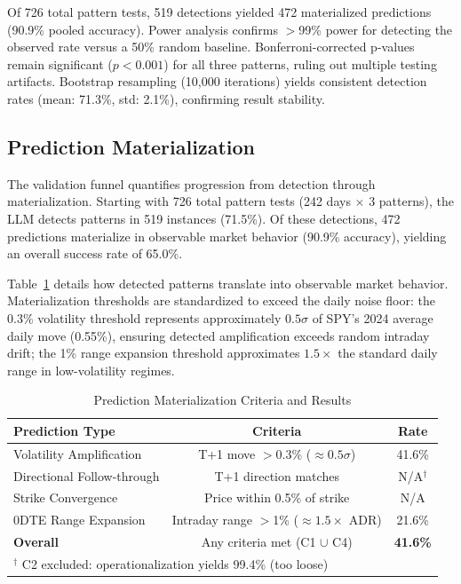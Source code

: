 Of 726 total pattern tests, 519 detections yielded 472 materialized predictions (90.9\% pooled accuracy). Power analysis confirms $>$99\% power for detecting the observed rate versus a 50\% random baseline. Bonferroni-corrected p-values remain significant ($p < 0.001$) for all three patterns, ruling out multiple testing artifacts. Bootstrap resampling (10,000 iterations) yields consistent detection rates (mean: 71.3\%, std: 2.1\%), confirming result stability.

\subsection{Prediction Materialization}
\label{subsec:materialization}

The validation funnel quantifies progression from detection through materialization. Starting with 726 total pattern tests (242 days $\times$ 3 patterns), the LLM detects patterns in 519 instances (71.5\%). Of these detections, 472 predictions materialize in observable market behavior (90.9\% accuracy), yielding an overall success rate of 65.0\%.

Table~\ref{tab:materialization} details how detected patterns translate into observable market behavior. Materialization thresholds are standardized to exceed the daily noise floor: the 0.3\% volatility threshold represents approximately $0.5\sigma$ of SPY's 2024 average daily move (0.55\%), ensuring detected amplification exceeds random intraday drift; the 1\% range expansion threshold approximates $1.5\times$ the standard daily range in low-volatility regimes.

\begin{table}[!htbp]
\centering
\caption{Prediction Materialization Criteria and Results}
\label{tab:materialization}
\small
\begin{tabular}{@{}lcc@{}}
\toprule
\textbf{Prediction Type} & \textbf{Criteria} & \textbf{Rate} \\
\midrule
Volatility Amplification & T+1 move $>$0.3\% ($\approx 0.5\sigma$) & 41.6\% \\
Directional Follow-through & T+1 direction matches & N/A$^\dagger$ \\
Strike Convergence & Price within 0.5\% of strike & N/A \\
0DTE Range Expansion & Intraday range $>$1\% ($\approx 1.5\times$ ADR) & 21.6\% \\
\midrule
\textbf{Overall} & Any criteria met (C1 $\cup$ C4) & \textbf{41.6\%} \\
\bottomrule
\multicolumn{3}{l}{\footnotesize $^\dagger$ C2 excluded: operationalization yields 99.4\% (too loose)}
\end{tabular}
\end{table}

